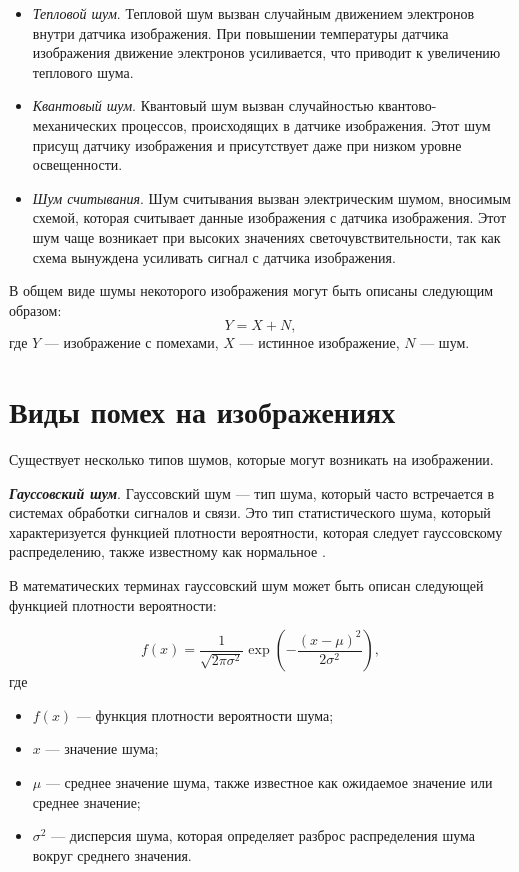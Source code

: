 \begin{itemize}
    \item \textit{Тепловой шум}. Тепловой шум вызван случайным движением электронов внутри датчика изображения. При повышении температуры датчика изображения движение электронов усиливается, что приводит к увеличению теплового шума.
    \item \textit{Квантовый шум}. Квантовый шум вызван случайностью квантово-механических процессов, происходящих в датчике изображения. Этот шум присущ датчику изображения и присутствует даже при низком уровне освещенности.
    \item \textit{Шум считывания}. Шум считывания вызван электрическим шумом, вносимым схемой, которая считывает данные изображения с датчика изображения. Этот шум чаще возникает при высоких значениях светочувствительности, так как схема вынуждена усиливать сигнал с датчика изображения.
\end{itemize}

В общем виде шумы некоторого изображения могут быть описаны следующим образом:
\begin{equation}
    Y = X + N,
\end{equation}
где $Y$ --- изображение с помехами, $X$ --- истинное изображение, $N$ --- шум. 

\section{Виды помех на изображениях}

Существует несколько типов шумов, которые могут возникать на изображении.

\textit{\textbf{Гауссовский шум}}. Гауссовский шум --- тип шума, который часто встречается в системах обработки сигналов и связи. Это тип статистического шума, который характеризуется функцией плотности вероятности, которая следует гауссовскому распределению, также известному как нормальное \cite{noisetypes}.

В математических терминах гауссовский шум может быть описан следующей функцией плотности вероятности:

\begin{equation}
    f(x) = \frac{1}{\sqrt{2 \pi \sigma^2}} \exp \left( -\frac{(x - \mu)^2}{2 \sigma^2} \right),
\end{equation}
где
\begin{itemize}
    \item $f(x)$ --- функция плотности вероятности шума;
    \item $x$ --- значение шума;
    \item $\mu$ --- среднее значение шума, также известное как ожидаемое значение или среднее значение;
    \item $\sigma^2$ --- дисперсия шума, которая определяет разброс распределения шума вокруг среднего значения.
\end{itemize}

